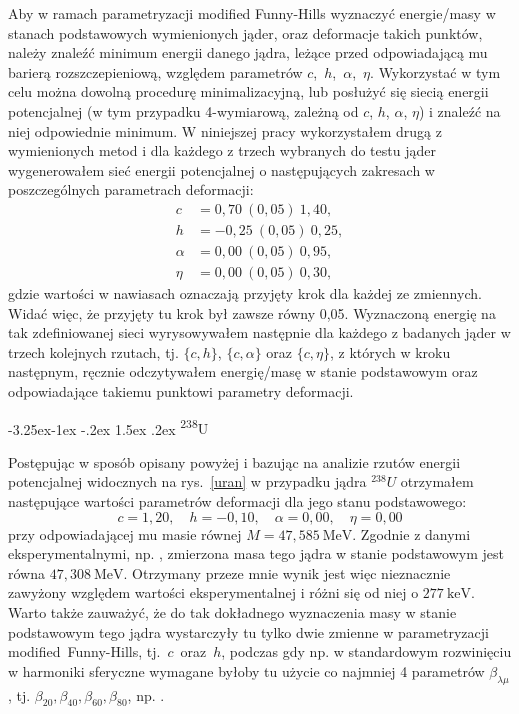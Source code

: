 \documentclass[a4paper,polish,twoside]{article}
\makeatletter
\renewcommand\subsubsection{\@startsection{subsubsection}{3}{\z@}%
	{-3.25ex\@plus -1ex \@minus -.2ex}%
	{1.5ex \@plus .2ex}%
	{\normalfont\normalsize\bfseries\boldmath}}
\numberwithin{equation}{section}
\makeatother
\begin{document}
Aby w ramach parametryzacji modified Funny-Hills wyznaczyć energie/masy w stanach podstawowych wymienionych jąder, oraz deformacje takich punktów, należy znaleźć minimum energii danego jądra, leżące przed odpowiadającą mu barierą rozszczepieniową, względem parametrów $c$,~$h$,~$\alpha$,~$\eta$. Wykorzystać w tym celu można dowolną procedurę minimalizacyjną, lub posłużyć się siecią energii potencjalnej (w tym przypadku 4-wymiarową, zależną od $c$, $h$, $\alpha$, $\eta$) i znaleźć na niej odpowiednie minimum. W niniejszej pracy wykorzystałem drugą z wymienionych metod i dla każdego z trzech wybranych do testu jąder wygenerowałem sieć energii potencjalnej o następujących zakresach w poszczególnych parametrach deformacji:
\begin{align*}
c&=0,70~(0,05)~1,40,\\
h&=-0,25~(0,05)~0,25,\\
\alpha&=0,00~(0,05)~0,95,\\
\eta&=0,00~(0,05)~0,30,
\end{align*}
gdzie wartości w nawiasach oznaczają przyjęty krok dla każdej ze zmiennych. Widać więc, że przyjęty tu krok był zawsze równy 0,05. Wyznaczoną energię na tak zdefiniowanej sieci wyrysowywałem następnie dla każdego z badanych jąder w trzech kolejnych rzutach, tj. $\{c,h\}$, $\{c,\alpha\}$ oraz $\{c,\eta\}$, z których w kroku następnym, ręcznie odczytywałem energię/masę w stanie podstawowym oraz odpowiadające takiemu punktowi parametry deformacji.

\clearpage
\subsubsection{\textsuperscript{238}U}

Postępując w sposób opisany powyżej i bazując na analizie rzutów energii potencjalnej widocznych na rys.~\ref{uran} w przypadku jądra $^{238}U$ otrzymałem następujące wartości parametrów deformacji dla jego stanu podstawowego:
\begin{equation*}
c=1,20, \quad h=-0,10, \quad \alpha=0,00, \quad \eta= 0,00
\end{equation*}
przy odpowiadającej mu masie równej $M=47,585~\mathrm{MeV}$. Zgodnie z danymi eksperymentalnymi, np. \cite{brookhaven}, zmierzona masa tego jądra w stanie podstawowym jest równa $47,308~\mathrm{MeV}$. Otrzymany przeze mnie wynik jest więc nieznacznie zawyżony względem wartości eksperymentalnej i różni się od niej o $277~\mathrm{keV}$. Warto także zauważyć, że do tak dokładnego wyznaczenia masy w stanie podstawowym tego jądra wystarczyły tu tylko dwie zmienne w parametryzacji \mbox{modified Funny-Hills}, \mbox{tj. $c$ oraz $h$}, podczas gdy np. w standardowym rozwinięciu w harmoniki sferyczne wymagane byłoby tu użycie co najmniej 4 parametrów $\beta_{\lambda \mu}$, tj. $\beta_{20},\beta_{40},\beta_{60},\beta_{80}$, np. \cite{JACHBF}.
\end{document}
